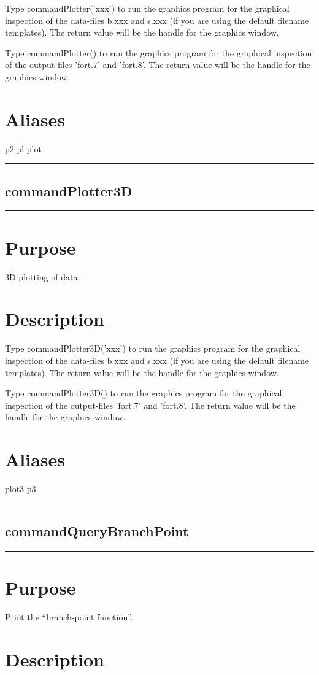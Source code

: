 \documentclass[12pt]{report}
\begin{document}
\begin{minipage}{6in}
    Type commandPlotter('xxx') to run the graphics program for the graphical
    inspection of the data-files b.xxx and s.xxx (if you are using the
    default filename templates).  The return value will be the handle
    for the graphics window.

    Type commandPlotter() to run the graphics program for the graphical
    inspection of the output-files 'fort.7' and 'fort.8'.  The return
    value will be the handle for the graphics window.
    \section*{Aliases}
p2 pl plot \medskip\hrule\end{minipage}\subsection{commandPlotter3D} \label{sec:clui_ref_commandPlotter3D}\begin{minipage}{6in}\hrule\medskip\section*{Purpose}
3D plotting of data.\section*{Description}

    Type commandPlotter3D('xxx') to run the graphics program for the graphical
    inspection of the data-files b.xxx and s.xxx (if you are using the
    default filename templates).  The return value will be the handle
    for the graphics window.

    Type commandPlotter3D() to run the graphics program for the graphical
    inspection of the output-files 'fort.7' and 'fort.8'.  The return
    value will be the handle for the graphics window.
    \section*{Aliases}
plot3 p3 \medskip\hrule\end{minipage}\subsection{commandQueryBranchPoint} \label{sec:clui_ref_commandQueryBranchPoint}\begin{minipage}{6in}\hrule\medskip\section*{Purpose}
Print the ``branch-point function''.\section*{Description}
    

\end{minipage}
\end{document}

